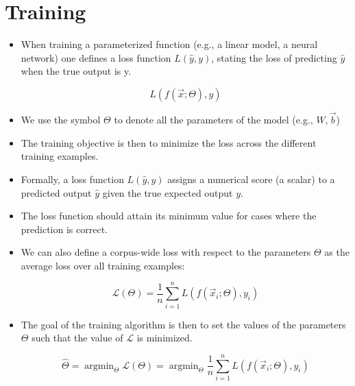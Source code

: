 \section{Training}
\begin{itemize}
\item  When training a parameterized function (e.g., a linear model, a neural network) one defines a loss function $L(\hat{y}, y)$, stating the loss of predicting $\hat{y}$ when the true output is y.

\begin{displaymath}
L(f(\vec{x};\Theta), y) 
\end{displaymath}

\item We use the symbol $\Theta$ to denote all the parameters of the model (e.g.,  $W, \vec{b}$)

\item The training objective is then to minimize the loss across the different training examples. 


\item Formally, a loss function $L(\hat{y},y)$ assigns a numerical score (a scalar) to a predicted output $\hat{y}$ given the true expected output $y$. 

\item The loss function should attain its minimum value for cases where the prediction is correct.

\item We can also define a corpus-wide loss with respect to the parameters $\Theta$ as the average loss over all training examples:

\begin{displaymath}
 \mathcal{L}(\Theta) = \frac{1}{n} \sum_{i=1}^n L(f(\vec{x}_i;\Theta), y_i)
\end{displaymath}

\item The goal of the training algorithm is then to set the values of the parameters $\Theta$  such that the value of $\mathcal{L}$ is minimized.


\begin{displaymath}
 \hat{\Theta} = \operatorname{argmin}_{\Theta} \mathcal{L}(\Theta) =  \operatorname{argmin}_{\Theta} \frac{1}{n} \sum_{i=1}^n L(f(\vec{x}_i;\Theta), y_i)
\end{displaymath}


\end{itemize}



